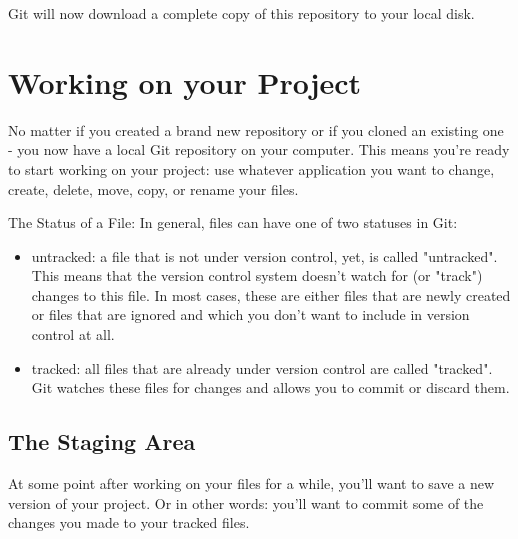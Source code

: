 \documentclass{article}
\begin{document}
Git will now download a complete copy of this repository to your local disk.

\section{Working on your Project}
No matter if you created a brand new repository or if you cloned an existing one - you now have a local Git repository on your computer. This means you're ready to start working on your project: use whatever application you want to change, create, delete, move, copy, or rename your files.


 \begin{concept}
The Status of a File: 
\newline\newline
In general, files can have one of two statuses in Git:
\begin{itemize}
    \item untracked: a file that is not under version control, yet, is called "untracked". This means that the version control system doesn't watch for (or "track") changes to this file. In most cases, these are either files that are newly created or files that are ignored and which you don't want to include in version control at all.
    \item tracked: all files that are already under version control are called "tracked". Git watches these files for changes and allows you to commit or discard them.
\end{itemize}
 \end{concept}
\subsection{The Staging Area}
At some point after working on your files for a while, you'll want to save a new version of your project. Or in other words: you'll want to commit some of the changes you made to your tracked files.
\end{document}
